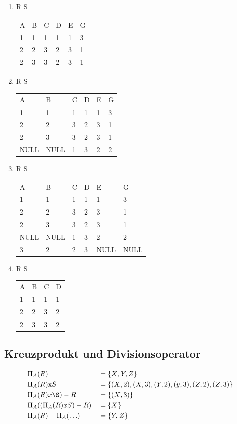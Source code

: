 \subsection{}
\begin{enumerate}
	\item R {\tiny  \textifsym{|><|}} S
	\begin{tabularx}{\textwidth}{XXXXXX}	
	A	&B	&C	&D	&E	&G \\
	1	&1	&1	&1	&1	&3 \\
	2	&2	&3	&2	&3	&1 \\
	2	&3	&3	&2	&3	&1 \\
	\end{tabularx}
	\item R {\tiny  {}} S
	\begin{tabularx}{\textwidth}{XXXXXX}	
	A	&B	&C	&D	&E	&G \\
	1	&1	&1	&1	&1	&3 \\
	2	&2	&3	&2	&3	&1 \\
	2	&3	&3	&2	&3	&1 \\
	NULL &NULL &1 &3 &2 &2 \\
	\end{tabularx}
	\item R {\tiny  {}} S
	\begin{tabularx}{\textwidth}{XXXXXX}	
	A	&B	&C	&D	&E	&G \\
	1	&1	&1	&1	&1	&3 \\
	2	&2	&3	&2	&3	&1 \\
	2	&3	&3	&2	&3	&1 \\
	NULL &NULL &1 &3 &2 &2 \\
	3	&2	&2	&3	&NULL &NULL \\
	\end{tabularx}
	\item R {\tiny  \textifsym{|><}} S
	\begin{tabularx}{\textwidth}{XXXX}	
	A	&B	&C	&D \\
	1	&1	&1	&1 \\
	2	&2	&3	&2 \\
	2	&3	&3	&2 \\
	\end{tabularx}
\end{enumerate}
\subsection{Kreuzprodukt und Divisionsoperator}
\begin{align*}
	&\Pi_A(R) &&= \{X,Y,Z\} \\
	&\Pi_A(R) \text{x} S &&= \{(X,2),(X,3),(Y,2),(y,3),(Z,2),(Z,3)\} \\
	&\Pi_A(R) x \S) - R &&= \{(X,3)\} \\
	&\Pi_A((\Pi_A (R)xS)-R) &&= \{X\} \\
	&\Pi_A(R) - \Pi_A (\ldots ) &&= \{Y,Z\}
\end{align*}